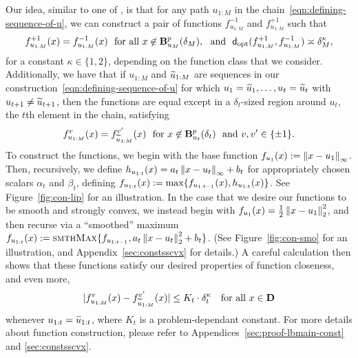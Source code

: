 Our idea, similar to one of \citet{SmithThUp17}, is that for any path
$u_{1:M}$ in the chain~\eqref{eqn:defining-sequence-of-u}, we can construct
a pair of functions $f_{u_{1:M}}^{-1}$ and $f_{u_{1:M}}^{+1}$ such that
\begin{equation}
  \label{eqn:function-pair-dist}
  f^{+1}_{u_{1:M}}(x)
  = f^{-1}_{u_{1:M}}(x)
  ~~ \mbox{for~all~} x \not \in \ballp{u_M}{\delta_M},
  ~~ \mbox{and}~~
  \fndist(f^{+1}_{u_{1:M}}, f^{-1}_{u_{1:M}}) \asymp
  \delta_M^\kappa, 
\end{equation}
for a constant $\kappa \in \{1, 2\}$, depending on the function class that 
we consider.
Additionally, we have that if $u_{1:M}$ and $\widetilde{u}_{1:M}$ are sequences
in our construction~\eqref{eqn:defining-sequence-of-u} for which
$u_1 = \widetilde{u}_1, \ldots, u_t = \widetilde{u}_t$ with $u_{t + 1} \neq \widetilde{u}_{t + 1}$,
then the functions are equal except in a $\delta_t$-sized region around
$u_t$, the $t$th element in the chain, satisfying
\begin{equation}
  \label{eqn:function-value-same}
  f^{v}_{u_{1:M}}(x)
  = f^{v'}_{\widetilde{u}_{1:M}}(x)
  ~~ \mbox{for~} x \not \in \mathbf{B}^p_{u_t}({\delta_t}) ~~\mbox{and}~
  v, v' \in \{\pm 1\}.
\end{equation}
To construct the functions, we begin with the base function $f_{u_1}(x)
:= \left\|{x - u_1}\right\|_\infty$. Then, recursively, we define $h_{u_{1:{t}}}(x) = a_t
\left\|{x - u_t}\right\|_\infty + b_t$ for appropriately chosen scalars $\alpha_t$ and
$\beta_t$, defining $f_{u_{1:{t}}} (x) := \max \{ f_{u_{1:{t-1}}} (x), h_{u_{1:{t}}} (x) \}$. 
See Figure~\ref{fig:con-lip} for an illustration. In
the case that we desire our functions to be smooth and strongly convex, we
instead begin with $f_{u_1}(x) = \frac{1}{2} \left\|{x - u_1}\right\|_2^2$, and then recurse
via a ``smoothed'' maximum $f_{u_{1:{t}}}(x) := \textsc{smthMax}\{ f_{u_{1:{t-1}}},
a_t \left\|{x - u_t}\right\|_2^2 + b_t\}$. (See
Figure~\ref{fig:con-smo} for an illustration, and Appendix~\ref{sec:constsscvx} for details.) 
A careful calculation then shows that these
functions satisfy our desired properties of function closeness, and even
more, %
\begin{equation}
  \label{eqn:function-value-difference}
  |f^{v}_{u_{1:M}}(x)
  - f^{v'}_{\widetilde{u}_{1:M}}(x)|
  \le K_t \cdot \delta_t^\kappa
  ~~~ \mbox{for~all~} x \in \mathbf{D}
\end{equation}
whenever $u_{1:t} = \widetilde{u}_{1:t}$, where $K_t$ is a problem-dependant
constant. For more details about function construction, please refer to
Appendices~\ref{sec:proof-lbmain-const} and \ref{sec:constsscvx}.

